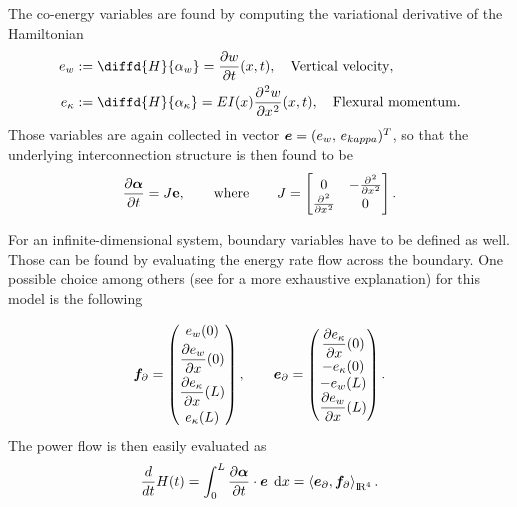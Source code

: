 \documentclass[preprint,12pt]{elsarticle}
\begin{document}
The co-energy variables are found by computing the variational derivative of the Hamiltonian
\begin{equation}
\begin{aligned}
e_{w} &:= \diffd{H}{\alpha_w} = \diffp{w}{t}(x,t) ,  \quad \text{Vertical velocity}, \\
e_{\kappa} &:= \diffd{H}{\alpha_{\kappa}} =EI(x) \diffp[2]{w}{x}(x,t),  \quad \text{Flexural momentum}. \\
\end{aligned}
\end{equation}
Those variables are again collected in vector $\bm{e} = (e_{w}, \, e_{\\kappa})^T $, so that the underlying interconnection structure is then found to be
\begin{equation}
\label{eq:PH_Timo}
\diffp{\bm{\alpha}}{t} = J \mathbf{e},  	\qquad \text{where} \qquad
J = 
\begin{bmatrix}
0 & -\diffp[2]{}{x} \\
\diffp[2]{}{x} & 0 \\
\end{bmatrix}.
\end{equation}

For an infinite-dimensional system, boundary variables have to be defined as well. Those can be found by evaluating the energy rate flow across the boundary. One possible choice among others (see \cite{articleFlavio} for a more exhaustive explanation) for this model is the following 

\begin{equation}
\bm{f}_{\partial} = 
\begin{pmatrix}
e_w(0) \vspace{3pt} \\
\displaystyle \diffp{e_{w}}{x}(0) \vspace{3pt}\\
\displaystyle \diffp{e_{\kappa}}{x}(L) \vspace{3pt}\\
e_{\kappa}(L) \\
\end{pmatrix}, \qquad
\bm{e}_{\partial} = 
\begin{pmatrix}
\displaystyle \diffp{e_{\kappa}}{x}(0) \vspace{1pt}\\
-e_{\kappa}(0) \\
-e_w(L) \\
\displaystyle \diffp{e_{w}}{x}(L)\\
\end{pmatrix}.
\end{equation}
The power flow is then easily evaluated as
\begin{equation}
\frac{d}{dt} H(t) = \int_{0}^{L} \diffp{\bm{\alpha}}{t} \cdot \bm{e} \, \d{x} = \left\langle \bm{e}_{\partial}, \bm{f}_{\partial} \right\rangle_{{\rm I\!R}^4}.
\end{equation}
\end{document}
